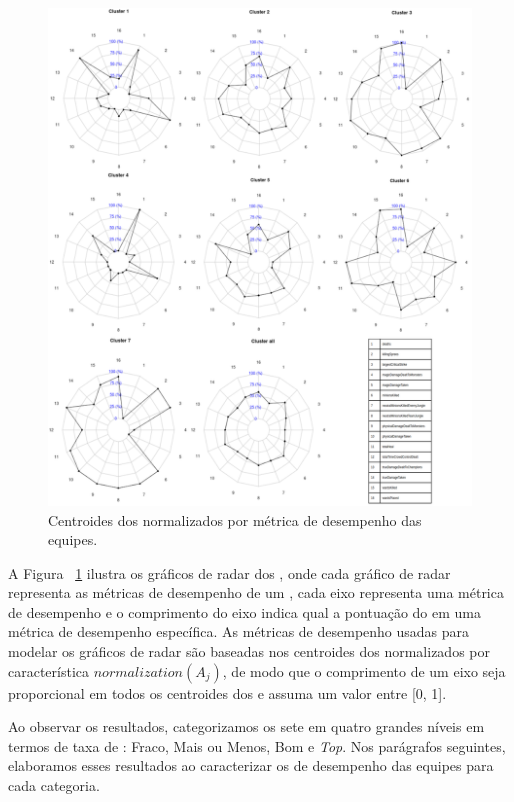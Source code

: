 \begin{figure}
\includegraphics[width=1\textwidth,height=\textheight,keepaspectratio]{radars}
\caption{Centroides dos  normalizados por métrica de desempenho das equipes.}
\label{fig:radars}
\end{figure}

A Figura ~\ref{fig:radars} ilustra os gráficos de radar dos , onde cada gráfico de radar representa as métricas de desempenho de um , cada eixo representa uma métrica de desempenho e o comprimento do eixo indica qual a pontuação do  em uma métrica de desempenho específica. As métricas de desempenho usadas para modelar os gráficos de radar são baseadas nos centroides dos  normalizados por característica $normalization(A_j)$, de modo que o comprimento de um eixo seja proporcional em todos os centroides dos  e assuma um valor entre [0, 1].


Ao observar os resultados, categorizamos os sete  em quatro grandes níveis em termos de taxa de : Fraco, Mais ou Menos, Bom e \textit{Top}. Nos parágrafos seguintes, elaboramos esses resultados ao caracterizar os  de desempenho das equipes para cada categoria.

